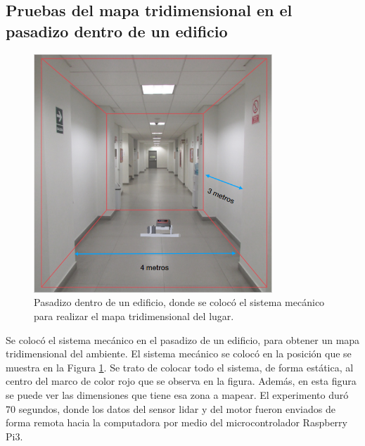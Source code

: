 \subsection{Pruebas del mapa tridimensional en el pasadizo dentro de un edificio}
\begin{figure}
  \centering \footnotesize
  \includegraphics[width=0.80\textwidth]{images/esan_lidar.PNG}
  \captionsetup{font=footnotesize}
  \caption{Pasadizo dentro de un edificio, donde se colocó el sistema mecánico para 
  realizar el mapa tridimensional del lugar.}
  \label{fig:pasadizoEsan}
\end{figure}

Se colocó el sistema mecánico en el pasadizo de un edificio, para obtener un mapa
tridimensional del ambiente. El sistema mecánico se colocó en la posición que se
muestra en la Figura \ref{fig:pasadizoEsan}. Se trato de colocar todo el sistema, de
forma estática, al centro del marco de color rojo que se observa en la figura. Además, 
en esta figura se puede ver las dimensiones que tiene esa zona a mapear. El experimento
duró 70 segundos, donde los datos del sensor lidar y del motor fueron enviados de forma
remota hacia la computadora por medio del microcontrolador Raspberry Pi3.



